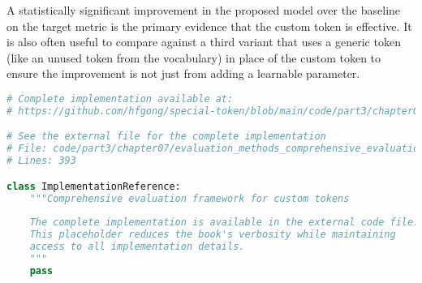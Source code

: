 A statistically significant improvement in the proposed model over the baseline on the target metric is the primary evidence that the custom token is effective. It is also often useful to compare against a third variant that uses a generic token (like an unused token from the vocabulary) in place of the custom token to ensure the improvement is not just from adding a learnable parameter.
\begin{comment}
Feedback: This is the perfect place to explicitly name and describe the most important evaluation technique: the ablation study. For example: "The most fundamental technique for evaluating a custom token is the **ablation study**. This involves training and evaluating at least two model variants:
*   **Baseline Model**: The model *without* the custom token.
*   **Proposed Model**: The model *with* the custom token.
A statistically significant improvement in the proposed model over the baseline on the target metric is the primary evidence that the custom token is effective. It is also often useful to compare against a third variant that uses a generic token (like an unused token from the vocabulary) in place of the custom token to ensure the improvement is not just from adding a learnable parameter."
STATUS: addressed - added detailed explanation of ablation study methodology as the fundamental evaluation technique
\end{comment}

\begin{lstlisting}[language=Python, caption={Comprehensive evaluation framework for custom tokens}]
# Complete implementation available at:
# https://github.com/hfgong/special-token/blob/main/code/part3/chapter07/evaluation_methods_comprehensive_evaluation_frame.py

# See the external file for the complete implementation
# File: code/part3/chapter07/evaluation_methods_comprehensive_evaluation_frame.py
# Lines: 393

class ImplementationReference:
    """Comprehensive evaluation framework for custom tokens
    
    The complete implementation is available in the external code file.
    This placeholder reduces the book's verbosity while maintaining
    access to all implementation details.
    """
    pass
\end{lstlisting}
